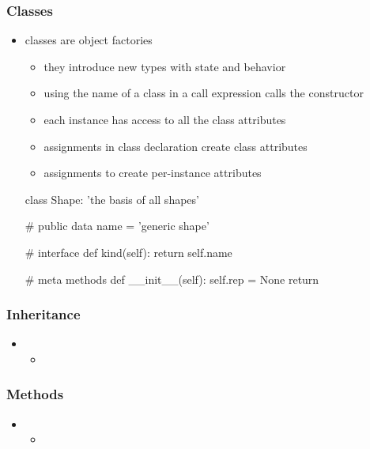 \begin{frame}[fragile]
%
  \frametitle{Classes}
%
  \begin{itemize}
%
  \item classes are object factories
    \begin{itemize}
    \item they introduce new types with state and behavior
    \item using the name of a class in a call expression calls the constructor
    \item each instance has access to all the class attributes
    \item assignments in class declaration create class attributes
    \item assignments to  create per-instance attributes
    \end{itemize}
%
    \begin{ipython}{}
      class Shape:
          'the basis of all shapes'

          # public data
          name = 'generic shape'

          # interface
          def kind(self): return self.name

          # meta methods
          def __init__(self):
              self.rep = None
              return
    \end{ipython}
%
  \end{itemize}
%
\end{frame}

\begin{frame}[fragile]
%
  \frametitle{Inheritance}
%
  \begin{itemize}
%
  \item 
    \begin{itemize}
    \item
    \end{itemize}
%
  \end{itemize}
%
\end{frame}

\begin{frame}[fragile]
%
  \frametitle{Methods}
%
  \begin{itemize}
%
  \item 
    \begin{itemize}
    \item
    \end{itemize}
%
  \end{itemize}
%
\end{frame}

